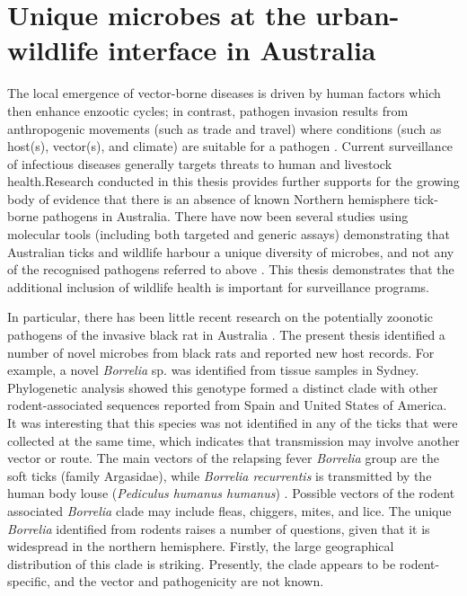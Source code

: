 \documentclass[a4paper, nobind]{templates/ociamthesis}
\begin{document}
\hypertarget{unique-microbes-at-the-urban-wildlife-interface-in-australia}{%
\section{Unique microbes at the urban-wildlife interface in Australia}\label{unique-microbes-at-the-urban-wildlife-interface-in-australia}}

The local emergence of vector-borne diseases is driven by human factors which then enhance enzootic cycles; in contrast, pathogen invasion results from anthropogenic movements (such as trade and travel) where conditions (such as host(s), vector(s), and climate) are suitable for a pathogen \autocite{kilpatrickDriversDynamicsControl2012}.
Current surveillance of infectious diseases generally targets threats to human and livestock health.Research conducted in this thesis provides further supports for the growing body of evidence that there is an absence of known Northern hemisphere tick-borne pathogens in Australia. There have now been several studies using molecular tools (including both targeted and generic assays) demonstrating that Australian ticks and wildlife harbour a unique diversity of microbes, and not any of the recognised pathogens referred to above \autocite{goftonBacterialProfilingReveals2015,eganBacterialCommunityProfiling2020,hussain-yusufScreeningRickettsiaCoxiella2020}. This thesis demonstrates that the additional inclusion of wildlife health is important for surveillance programs.

In particular, there has been little recent research on the potentially zoonotic pathogens of the invasive black rat in Australia \autocite{banksReviewEvidencePotential2012}.
The present thesis identified a number of novel microbes from black rats and reported new host records.
For example, a novel \emph{Borrelia} sp. was identified from tissue samples in Sydney.
Phylogenetic analysis showed this genotype formed a distinct clade with other rodent-associated sequences reported from Spain and United States of America.
It was interesting that this species was not identified in any of the ticks that were collected at the same time, which indicates that transmission may involve another vector or route.
The main vectors of the relapsing fever \emph{Borrelia} group are the soft ticks (family Argasidae), while \emph{Borrelia recurrentis} is transmitted by the human body louse (\emph{Pediculus humanus humanus}) \autocite{gilIdentificationNewBorrelia2005}.
Possible vectors of the rodent associated \emph{Borrelia} clade may include fleas, chiggers, mites, and lice.
The unique \emph{Borrelia} identified from rodents raises a number of questions, given that it is widespread in the northern hemisphere. Firstly, the large geographical distribution of this clade is striking. Presently, the clade appears to be rodent-specific, and the vector and pathogenicity are not known.
\end{document}
